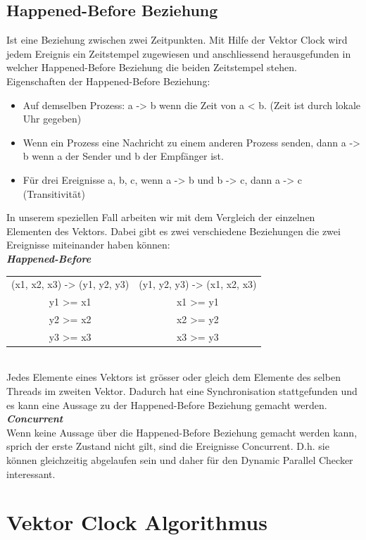 \documentclass[10pt,a4paper]{article}
\begin{document}
\subsection{Happened-Before Beziehung}
\begin{flushleft}
Ist eine Beziehung zwischen zwei Zeitpunkten. Mit Hilfe der Vektor Clock wird jedem Ereignis ein Zeitstempel zugewiesen und anschliessend herausgefunden in welcher Happened-Before Beziehung die beiden Zeitstempel stehen.\\
Eigenschaften der Happened-Before Beziehung:
\begin{itemize}
\item Auf demselben Prozess: a -> b wenn die Zeit von a < b. (Zeit ist durch lokale Uhr gegeben)
\item Wenn ein Prozess eine Nachricht zu einem anderen Prozess senden, dann a -> b wenn a der Sender und b der Empfänger ist.
\item Für drei Ereignisse a, b, c, wenn a -> b und b -> c, dann a -> c (Transitivität)
\end{itemize}
In unserem speziellen Fall arbeiten wir mit dem Vergleich der einzelnen Elementen des Vektors. Dabei gibt es zwei verschiedene Beziehungen die zwei Ereignisse miteinander haben können:\\
\textit{\textbf{Happened-Before}\\[0.2cm]}
\begin{tabular}{ c c }
  (x1, x2, x3) -> (y1, y2, y3) & (y1, y2, y3) -> (x1, x2, x3) \\
  y1 >= x1 & x1 >= y1 \\
  y2 >= x2 & x2 >= y2 \\
  y3 >= x3 & x3 >= y3 \\[0.2cm]
\end{tabular}
\\Jedes Elemente eines Vektors ist grösser oder gleich dem Elemente des selben Threads im zweiten Vektor. Dadurch hat eine Synchronisation stattgefunden und es kann eine Aussage zu der Happened-Before Beziehung gemacht werden.\\
\textit{\textbf{Concurrent}\\}
Wenn keine Aussage über die Happened-Before Beziehung gemacht werden kann, sprich der erste Zustand nicht gilt, sind die Ereignisse Concurrent. D.h. sie können gleichzeitig abgelaufen sein und daher für den Dynamic Parallel Checker interessant.\\
\end{flushleft}
\newpage
\section{Vektor Clock Algorithmus}
\end{document}
